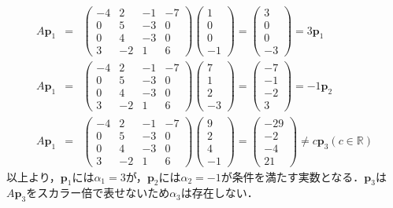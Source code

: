 \documentclass[11pt, titlepage]{jsarticle}
\begin{document}
\begin{eqnarray*}
  A \boldsymbol p_1&=&\begin{pmatrix}
    -4 & 2  & -1 & -7 \\
    0  & 5  & -3 & 0  \\
    0  & 4  & -3 & 0  \\
    3  & -2 & 1  & 6
  \end{pmatrix}\begin{pmatrix}
    1 \\
    0 \\
    0 \\
    -1
  \end{pmatrix}=\begin{pmatrix}
    3 \\
    0 \\
    0 \\
    -3
  \end{pmatrix}=3 \boldsymbol p_1\\
  A \boldsymbol p_1&=&\begin{pmatrix}
    -4 & 2  & -1 & -7 \\
    0  & 5  & -3 & 0  \\
    0  & 4  & -3 & 0  \\
    3  & -2 & 1  & 6
  \end{pmatrix}\begin{pmatrix}
    7 \\
    1 \\
    2 \\
    -3
  \end{pmatrix}=\begin{pmatrix}
    -7 \\
    -1 \\
    -2 \\
    3
  \end{pmatrix}=-1 \boldsymbol p_2\\
  A \boldsymbol p_1&=&\begin{pmatrix}
    -4 & 2  & -1 & -7 \\
    0  & 5  & -3 & 0  \\
    0  & 4  & -3 & 0  \\
    3  & -2 & 1  & 6
  \end{pmatrix}\begin{pmatrix}
    9 \\
    2 \\
    4 \\
    -1
  \end{pmatrix}=\begin{pmatrix}
    -29 \\
    -2  \\
    -4  \\
    21
  \end{pmatrix}\neq c \boldsymbol p_3 (c \in \mathbb R)
\end{eqnarray*}
以上より，$\boldsymbol p_1$には$\alpha_1=3$が，$\boldsymbol p_2$には$\alpha_2=-1$が条件を満たす実数となる．$\boldsymbol p_3$は$A \boldsymbol p_3$をスカラー倍で表せないため$\alpha_3$は存在しない．
\newpage
\end{document}

